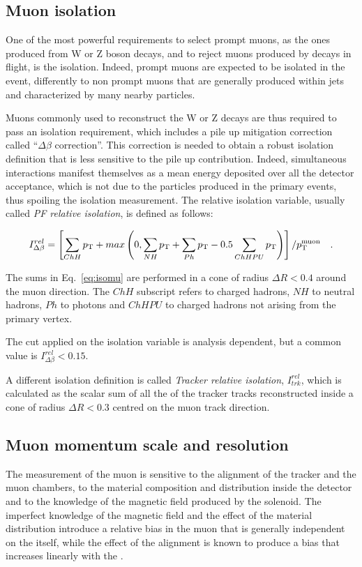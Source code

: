\subsection{Muon isolation}
One of the most powerful requirements to select prompt muons, as the ones produced from W or Z boson decays, and to reject muons produced by decays in flight, is the isolation. Indeed, prompt muons are expected to be isolated in the event, differently to non prompt muons that are generally produced within jets and characterized by many nearby particles.

Muons commonly used to reconstruct the W or Z decays are thus required to pass an isolation requirement, which includes a pile up mitigation correction called ``$\Delta\beta$ correction''. This correction is needed to obtain a robust isolation definition that is less sensitive to the pile up contribution. Indeed, simultaneous interactions manifest themselves as a mean energy deposited over all the detector acceptance, which is not due to the particles produced in the primary events, thus spoiling the isolation measurement. The relative isolation variable, usually called \emph{PF relative isolation}, is defined as follows:

\begin{equation}\label{eq:isomu}
I^{rel}_{\Delta\beta} = \left[  \sum_{ChH}p_\mathrm{T} + max\left(0, \sum_{NH}p_\mathrm{T} + \sum_{Ph}p_\mathrm{T} - 0.5\sum_{ChHPU}p_\mathrm{T}    \right)  \right]/p_\mathrm{T}^\mathrm{muon} \quad .
\end{equation}

The sums in Eq.~\eqref{eq:isomu} are performed in a cone of radius $\Delta R < 0.4$ around the muon direction. The $ChH$ subscript refers to charged hadrons, $NH$ to neutral hadrons, $Ph$ to photons and $ChHPU$ to charged hadrons not arising from the primary vertex.

The cut applied on the isolation variable is analysis dependent, but a common value is $I^{rel}_{\Delta\beta} < 0.15$.

A different isolation definition is called \emph{Tracker relative isolation}, $I^{rel}_{trk}$, which is calculated as the scalar sum of all the \pt of the tracker tracks reconstructed inside a cone of radius $\Delta R < 0.3$ centred on the muon track direction.

\subsection{Muon momentum scale and resolution}
The measurement of the muon \pt is sensitive to the alignment of the tracker and the muon chambers, to the material composition and distribution inside the detector and to the knowledge of the magnetic field produced by the solenoid. The imperfect knowledge of the magnetic field and the effect of the material distribution introduce a relative bias in the muon \pt that is generally independent on the \pt itself, while the effect of the alignment is known to produce a bias that increases linearly with the \pt.

